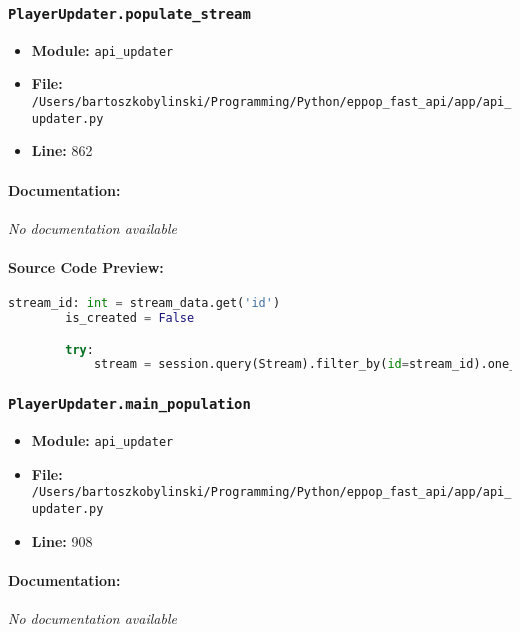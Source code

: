 \documentclass[11pt,a4paper]{article}
\begin{document}
\vspace{1em}
\subsubsection{\texttt{PlayerUpdater.populate\_stream}}

\begin{itemize}
    \item \textbf{Module:} \texttt{api\_updater}
    \item \textbf{File:} \texttt{/Users/bartoszkobylinski/Programming/Python/eppop\_fast\_api/app/api\_updater.py}
    \item \textbf{Line:} 862
\end{itemize}

\paragraph{Documentation:} \textit{No documentation available}

\paragraph{Source Code Preview:}
\begin{lstlisting}[language=Python]
        stream_id: int = stream_data.get('id')
        is_created = False

        try:
            stream = session.query(Stream).filter_by(id=stream_id).one_or_none()
\end{lstlisting}

\vspace{1em}
\subsubsection{\texttt{PlayerUpdater.main\_population}}

\begin{itemize}
    \item \textbf{Module:} \texttt{api\_updater}
    \item \textbf{File:} \texttt{/Users/bartoszkobylinski/Programming/Python/eppop\_fast\_api/app/api\_updater.py}
    \item \textbf{Line:} 908
\end{itemize}

\paragraph{Documentation:} \textit{No documentation available}
\end{document}
